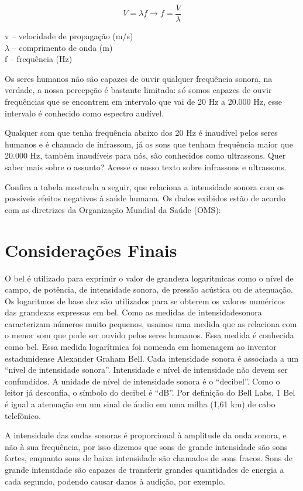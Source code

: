 \documentclass[
	article,		
	11pt,			
	oneside,		
	a4paper,			
	english,			
	brazil			
]{abntex2}
\begin{document}
\begin{equation}
    V = \lambda f \rightarrow f = \frac{V}{\lambda}
\end{equation}

\begin{center}
    v – velocidade de propagação (m/s)\\
    $\lambda$ – comprimento de onda (m)\\
    f – frequência (Hz)
\end{center}

Os seres humanos não são capazes de ouvir qualquer frequência sonora, na verdade, a nossa percepção é bastante limitada: só somos capazes de ouvir frequências que se encontrem em intervalo que vai de 20 Hz a 20.000 Hz, esse intervalo é conhecido como espectro audível.

Qualquer som que tenha frequência abaixo dos 20 Hz é inaudível pelos seres humanos e é chamado de infrassom, já os sons que tenham frequência maior que 20.000 Hz, também inaudíveis para nós, são conhecidos como ultrassons. Quer saber mais sobre o assunto? Acesse o nosso texto sobre infrassons e ultrassons.

Confira a tabela mostrada a seguir, que relaciona a intensidade sonora com os possíveis efeitos negativos à saúde humana. Os dados exibidos estão de acordo com as diretrizes da Organização Mundial da Saúde (OMS):
\newpage



\section{Considerações Finais}

O bel é utilizado para exprimir o valor de grandeza logarítmicas como o nível de campo, de potência, de intensidade sonora, de pressão acústica ou de atenuação. Os logaritmos de base dez são utilizados para se obterem os valores numéricos das grandezas expressas em bel. Como as medidas de intensidadesonora caracterizam números muito pequenos, usamos uma medida que as relaciona com o menor som que pode ser ouvido pelos seres humanos. Essa medida é conhecida como bel. Essa medida logarítmica foi nomeada em homenagem ao inventor estadunidense Alexander Graham Bell.
Cada intensidade sonora é associada a um “nível de intensidade sonora”. Intensidade e nível de intensidade não devem ser confundidos. A unidade de nível de intensidade sonora é o “decibel”. Como o leitor já desconfia, o símbolo do decibel é “dB”. Por definição do Bell Labs, 1 Bel é igual a atenuação em um sinal de áudio em uma milha (1,61 km) de cabo telefônico.

A intensidade das ondas sonoras é proporcional à amplitude da onda sonora, e não à sua frequência, por isso dizemos que sons de grande intensidade são sons fortes, enquanto sons de baixa intensidade são chamados de sons fracos. Sons de grande intensidade são capazes de transferir grandes quantidades de energia a cada segundo, podendo causar danos à audição, por exemplo.



\end{document}
